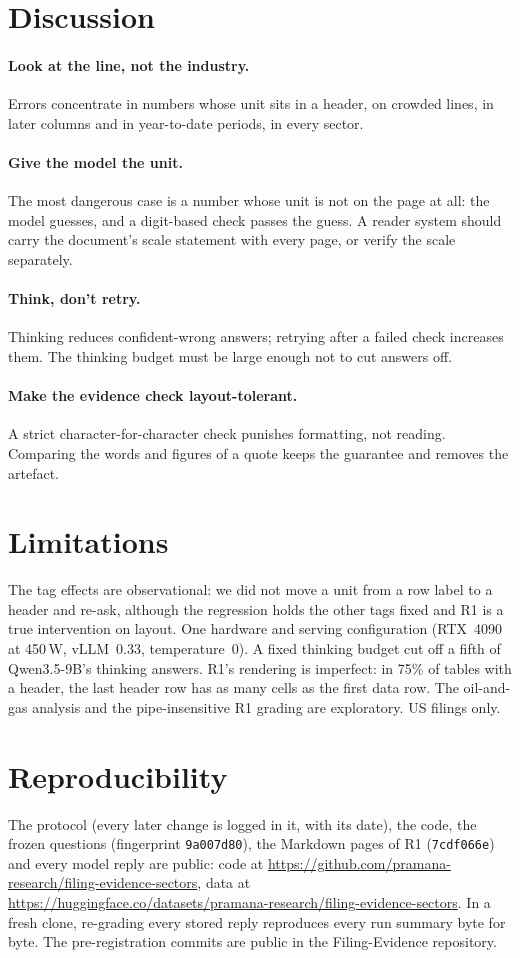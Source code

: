 \documentclass[11pt]{article}
\begin{document}
\section{Discussion}
\paragraph{Look at the line, not the industry.} Errors concentrate in numbers whose unit sits in a header, on crowded lines, in later columns and in year-to-date periods, in every sector.
\paragraph{Give the model the unit.} The most dangerous case is a number whose unit is not on the page at all: the model guesses, and a digit-based check passes the guess. A reader system should carry the document's scale statement with every page, or verify the scale separately.
\paragraph{Think, don't retry.} Thinking reduces confident-wrong answers; retrying after a failed check increases them. The thinking budget must be large enough not to cut answers off.
\paragraph{Make the evidence check layout-tolerant.} A strict character-for-character check punishes formatting, not reading. Comparing the words and figures of a quote keeps the guarantee and removes the artefact.

\section{Limitations}
The tag effects are observational: we did not move a unit from a row label to a header and re-ask, although the regression holds the other tags fixed and R1 is a true intervention on layout. One hardware and serving configuration (RTX~4090 at 450\,W, vLLM~0.33, temperature~0). A fixed thinking budget cut off a fifth of Qwen3.5-9B's thinking answers. R1's rendering is imperfect: in 75\% of tables with a header, the last header row has as many cells as the first data row. The oil-and-gas analysis and the pipe-insensitive R1 grading are exploratory. US filings only.

\section{Reproducibility}
The protocol (every later change is logged in it, with its date), the code, the frozen questions (fingerprint \texttt{9a007d80}), the Markdown pages of R1 (\texttt{7cdf066e}) and every model reply are public: code at \url{https://github.com/pramana-research/filing-evidence-sectors}, data at \url{https://huggingface.co/datasets/pramana-research/filing-evidence-sectors}. In a fresh clone, re-grading every stored reply reproduces every run summary byte for byte. The pre-registration commits are public in the Filing-Evidence repository.
\end{document}
